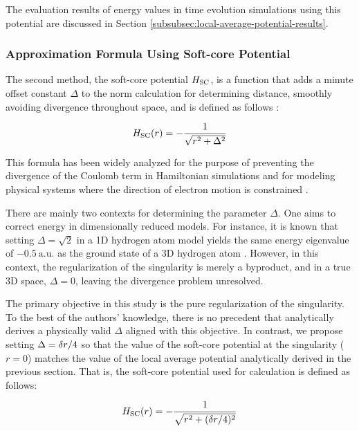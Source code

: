\documentclass[report_2025.tex]{subfiles}
\begin{document}
The evaluation results of energy values in time evolution simulations using this
potential are discussed in Section
\ref{subsubsec:local-average-potential-results}.

\subsubsection{Approximation Formula Using Soft-core Potential}

The second method, the soft-core potential $H_{\mathrm{SC}}$, is a function that adds a
minute offset constant $\Delta$ to the norm calculation for determining
distance, smoothly avoiding divergence throughout space, and is defined as
follows \cite{Kivlichan_2017}:

\begin{equation}
H_{\mathrm{SC}}(r) = -\frac{1}{\sqrt{r^2+\Delta^2}}
\label{eq:Hsc2r}
\end{equation}

This formula has been widely analyzed for the purpose of preventing the
divergence of the Coulomb term in Hamiltonian simulations
\cite{Childs2022quantumsimulationof} and for modeling physical systems where the
direction of electron motion is constrained \cite{Hall2009.PhysRevA.80.032507,
Fernandez_1991, LiChen2021.doi:10.1021/acs.jpca.1c00698}.

There are mainly two contexts for determining the parameter $\Delta$. One aims
to correct energy in dimensionally reduced models. For instance, it is known
that setting $\Delta=\sqrt{2}$ in a 1D hydrogen atom model yields the same
energy eigenvalue of $-0.5\ \mathrm{a.u.}$ as the ground state of a 3D hydrogen
atom \cite{Eberly1991.PhysRevA.44.5997}. However, in this context, the
regularization of the singularity is merely a byproduct, and in a true 3D space,
$\Delta=0$, leaving the divergence problem unresolved.

The primary objective in this study is the pure regularization of the
singularity. To the best of the authors' knowledge, there is no precedent that
analytically derives a physically valid $\Delta$ aligned with this objective. In
contrast, we propose setting $\Delta = \delta r/4$ so that the value of the
soft-core potential at the singularity ($r=0$) matches the value of the local
average potential analytically derived in the previous section. That is, the
soft-core potential used for calculation is defined as follows:

\begin{equation}
H_{\mathrm{SC}}(r) = - \frac{1}{\sqrt{r^2+(\delta r/4)^2}}
\label{eq:Hsc2r-fixed}
\end{equation}
\end{document}
